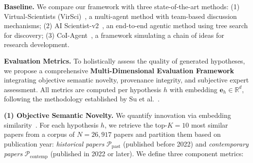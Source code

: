 \documentclass[runningheads]{llncs}
\begin{document}
\textbf{Baseline.} We compare our framework with three state-of-the-art methods: (1) Virtual-Scientists (VirSci)~\cite{DBLP:journals/corr/abs-2410-09403}, a multi-agent method with team-based discussion mechanisms; (2) AI Scientist-v2~\cite{DBLP:journals/corr/abs-2408-06292}, an end-to-end agentic method using tree search for discovery; (3) CoI-Agent~\cite{li2024chain}, a framework simulating a chain of ideas for research development.

\textbf{Evaluation Metrics.} To holistically assess the quality of generated hypotheses, we propose a comprehensive \textbf{Multi-Dimensional Evaluation Framework} integrating objective semantic novelty, provenance integrity, and subjective expert assessment. All metrics are computed per hypothesis $h$ with embedding $\mathbf{e}_h \in \mathbb{R}^d$, following the methodology established by Su et al.~\cite{su2025many}.

\textbf{(1) Objective Semantic Novelty.} We quantify innovation via embedding similarity~\cite{shao2020bertpli,shi2023surprising}. For each hypothesis $h$, we retrieve the top-$K=10$ most similar papers from a corpus of $N=26{,}917$ papers and partition them based on publication year: \textit{historical papers} $\mathcal{P}_{\text{past}}$ (published before 2022) and \textit{contemporary papers} $\mathcal{P}_{\text{contemp}}$ (published in 2022 or later). We define three component metrics:
\end{document}
